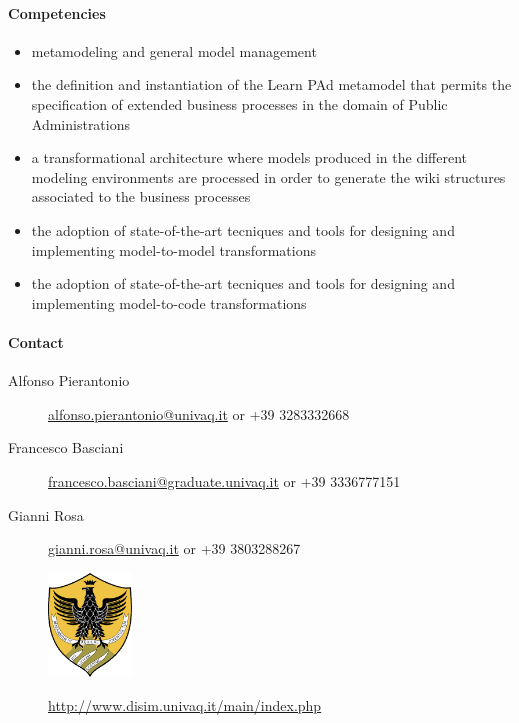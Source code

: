 \documentclass{learnpad}
\begin{document}
\paragraph{Competencies}
\begin{itemize}
	\item metamodeling and general model management
	\item the definition and instantiation of the Learn PAd metamodel that
		permits the specification of extended business processes in the domain
		of Public Administrations
	\item a transformational architecture where models produced in the different
		modeling environments are processed in order to generate the wiki
		structures associated to the business processes
	\item the adoption of state-of-the-art tecniques and tools for designing and
		implementing model-to-model transformations
	\item the adoption of state-of-the-art tecniques and tools for designing and
		implementing model-to-code transformations
\end{itemize}

\paragraph{Contact}
\begin{description}
	\item[Alfonso Pierantonio] \href{mailto:alfonso.pierantonio@univaq.it}{alfonso.pierantonio@univaq.it} or +39 3283332668
	\item[Francesco Basciani] \href{mailto:francesco.basciani@graduate.univaq.it}{francesco.basciani@graduate.univaq.it} or +39 3336777151
	\item[Gianni Rosa] \href{mailto:gianni.rosa@univaq.it}{gianni.rosa@univaq.it} or +39 3803288267
\end{description}

\begin{figure}[!htp]
	\centering
	\includegraphics[width=6em,keepaspectratio]{figures/univaq.png}\par
	\url{http://www.disim.univaq.it/main/index.php}
\end{figure}
\end{document}
